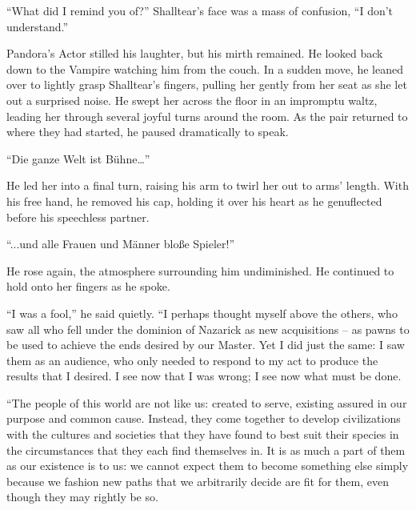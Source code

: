  

“What did I remind you of?” Shalltear’s face was a mass of confusion, “I don’t understand.”

 

Pandora’s Actor stilled his laughter, but his mirth remained. He looked back down to the Vampire watching him from the couch. In a sudden move, he leaned over to lightly grasp Shalltear’s fingers, pulling her gently from her seat as she let out a surprised noise. He swept her across the floor in an impromptu waltz, leading her through several joyful turns around the room. As the pair returned to where they had started, he paused dramatically to speak.

 

“Die ganze Welt ist Bühne…”

 

He led her into a final turn, raising his arm to twirl her out to arms’ length. With his free hand, he removed his cap, holding it over his heart as he genuflected before his speechless partner.

 

“...und alle Frauen und Männer bloße Spieler!”

 

He rose again, the atmosphere surrounding him undiminished. He continued to hold onto her fingers as he spoke.

 

“I was a fool,” he said quietly. “I perhaps thought myself above the others, who saw all who fell under the dominion of Nazarick as new acquisitions – as pawns to be used to achieve the ends desired by our Master. Yet I did just the same: I saw them as an audience, who only needed to respond to my act to produce the results that I desired. I see now that I was wrong; I see now what must be done.

 

“The people of this world are not like us: created to serve, existing assured in our purpose and common cause. Instead, they come together to develop civilizations with the cultures and societies that they have found to best suit their species in the circumstances that they each find themselves in. It is as much a part of them as our existence is to us: we cannot expect them to become something else simply because we fashion new paths that we arbitrarily decide are fit for them, even though they may rightly be so.

 

